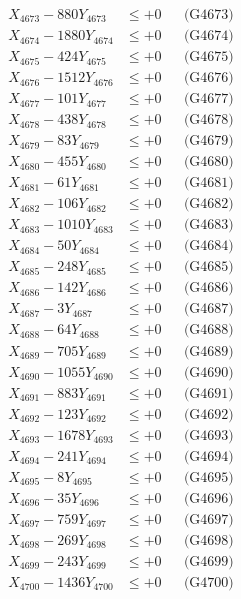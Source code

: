 \documentclass[a4paper,10pt]{article}
\begin{document}
{\begin{align}
X_{4673} - 880Y_{4673} &\leq +0 && \text{(G4673)} \\
X_{4674} - 1880Y_{4674} &\leq +0 && \text{(G4674)} \\
X_{4675} - 424Y_{4675} &\leq +0 && \text{(G4675)} \\
X_{4676} - 1512Y_{4676} &\leq +0 && \text{(G4676)} \\
X_{4677} - 101Y_{4677} &\leq +0 && \text{(G4677)} \\
X_{4678} - 438Y_{4678} &\leq +0 && \text{(G4678)} \\
X_{4679} - 83Y_{4679} &\leq +0 && \text{(G4679)} \\
X_{4680} - 455Y_{4680} &\leq +0 && \text{(G4680)} \\
\allowbreak
X_{4681} - 61Y_{4681} &\leq +0 && \text{(G4681)} \\
X_{4682} - 106Y_{4682} &\leq +0 && \text{(G4682)} \\
X_{4683} - 1010Y_{4683} &\leq +0 && \text{(G4683)} \\
X_{4684} - 50Y_{4684} &\leq +0 && \text{(G4684)} \\
X_{4685} - 248Y_{4685} &\leq +0 && \text{(G4685)} \\
X_{4686} - 142Y_{4686} &\leq +0 && \text{(G4686)} \\
X_{4687} - 3Y_{4687} &\leq +0 && \text{(G4687)} \\
X_{4688} - 64Y_{4688} &\leq +0 && \text{(G4688)} \\
X_{4689} - 705Y_{4689} &\leq +0 && \text{(G4689)} \\
X_{4690} - 1055Y_{4690} &\leq +0 && \text{(G4690)} \\
\allowbreak
X_{4691} - 883Y_{4691} &\leq +0 && \text{(G4691)} \\
X_{4692} - 123Y_{4692} &\leq +0 && \text{(G4692)} \\
X_{4693} - 1678Y_{4693} &\leq +0 && \text{(G4693)} \\
X_{4694} - 241Y_{4694} &\leq +0 && \text{(G4694)} \\
X_{4695} - 8Y_{4695} &\leq +0 && \text{(G4695)} \\
X_{4696} - 35Y_{4696} &\leq +0 && \text{(G4696)} \\
X_{4697} - 759Y_{4697} &\leq +0 && \text{(G4697)} \\
X_{4698} - 269Y_{4698} &\leq +0 && \text{(G4698)} \\
X_{4699} - 243Y_{4699} &\leq +0 && \text{(G4699)} \\
X_{4700} - 1436Y_{4700} &\leq +0 && \text{(G4700)} \\

\end{align}}
\end{document}
